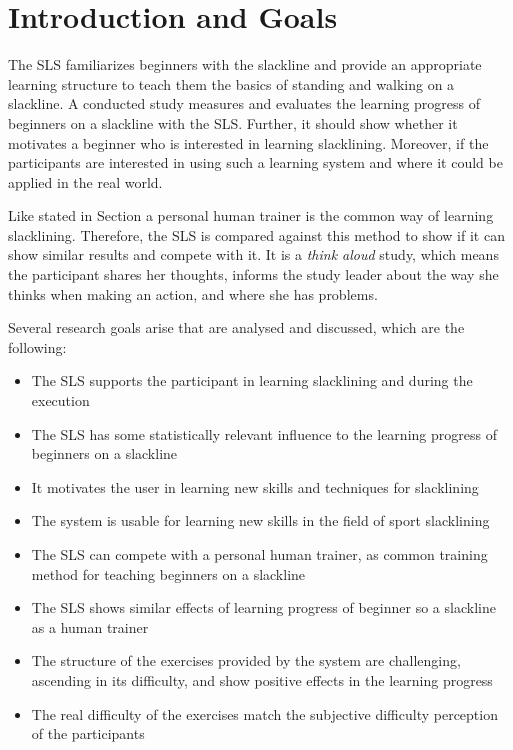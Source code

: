 \section{Introduction and Goals}\label{6_introduction}
The SLS familiarizes beginners with the slackline and provide an appropriate learning structure to teach them the basics of standing and walking on a slackline.
A conducted study measures and evaluates the learning progress of beginners on a slackline with the SLS.
Further, it should show whether it motivates a beginner who is interested in learning slacklining.
Moreover, if the participants are interested in using such a learning system and where it could be applied in the real world.

Like stated in Section  a personal human trainer is the common way of learning slacklining.
Therefore, the SLS is compared against this method to show if it can show similar results and compete with it.
It is a \textit{think aloud} study, which means the participant shares her thoughts, informs the study leader about the way she thinks when making an action, and where she has problems.

Several research goals arise that are analysed and discussed, which are the following:

\begin{itemize}
\item The SLS supports the participant in learning slacklining and during the execution
\item The SLS has some statistically relevant influence to the learning progress of beginners on a slackline
\item It motivates the user in learning new skills and techniques for slacklining
\item The system is usable for learning new skills in the field of sport slacklining
\item The SLS can compete with a personal human trainer, as common training method for teaching beginners on a slackline
\item The SLS shows similar effects of learning progress of beginner so a slackline as a human trainer
\item The structure of the exercises provided by the system are challenging, ascending in its difficulty, and show positive effects in the learning progress
\item The real difficulty of the exercises match the subjective difficulty perception of the participants
\end{itemize}
